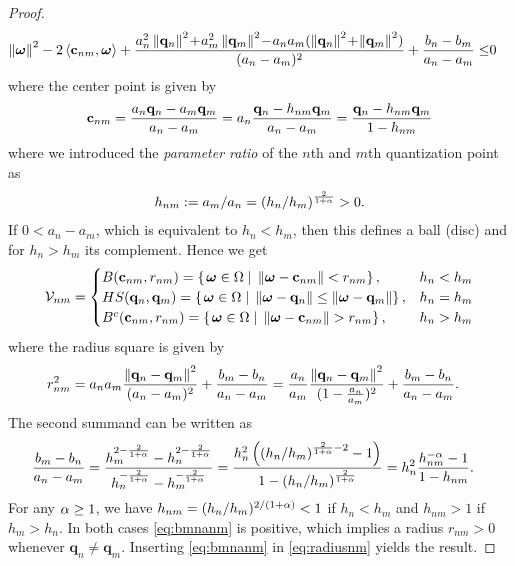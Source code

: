 \documentclass[smallabstract,smallcaptions]{dccpaper}
\renewcommand{\vp}{\mathbf q}
\newcommand{\Vor}{\ensuremath{\mathcal{V}}}         %
\begin{document}
\begin{proof}
\begin{align*}
      \Norm{\vome}^2 -2 \skprod{\vc_{nm}}{\vome} + 
         \frac{a_n^2 \Norm{\vp_n}^2 \!+\!a_m^2 \Norm{\vp_m}^2 \!-\! a_na_m(\Norm{\vp_n}^2 \!+\!\Norm{\vp_m}^2)}{(a_n-a_m)^2} 
         + \frac{b_n-b_m}{a_n-a_m} \leq & 0
  \end{align*}
  where the center point is given by
  \begin{align}
    \vc_{nm}=\frac{a_n\vp_n- a_m\vp_m}{a_n-a_m}=a_n \frac{\vp_n-h_{nm} \vp_m}{a_n -a_m}=\frac{\vp_n -h_{nm}\vp_m}{1-h_{nm}} 
  \end{align}
  where we introduced the \emph{parameter ratio} of the $n$th and $m$th quantization point as
  \begin{align}
    h_{nm}:= a_m/a_n=\left(h_n/h_m\right)^{\frac{2}{1+\alpha}}>0.
  \end{align}
  If $0<a_n-a_m$, which is equivalent to $h_n<h_m$, then this defines a ball (disc) and for $h_n>h_m$ its complement. Hence we get
  \begin{align}
    \Vor_{nm}=\begin{cases}
      B(\vc_{nm},r_{nm})=\set{\vome\in\Omega}{\Norm{\vome-\vc_{nm}}    <  r_{nm}},&  h_n<h_m\\
      HS(\vp_n,\vp_m) = \set{\vome\in\Omega}{ \Norm{\vome- \vp_n}\leq \Norm{\vome- \vp_m}}, &h_n=h_m\\
      B^c(\vc_{nm},r_{nm})=\set{\vome\in\Omega}{\Norm{\vome-\vc_{nm}}    >  r_{nm}},&  h_n >h_m
    \end{cases}
  \end{align}
  where the radius square is given by
  \begin{align}
    r_{nm}^2 
            &= a_na_m\frac{\Norm{\vp_n-\vp_m}^2}{(a_n-a_m)^2} + \frac{b_m-b_n}{a_n-a_m}=
            \frac{a_n}{a_m}\frac{\Norm{\vp_n-\vp_m}^2}{(1-\frac{a_n}{a_m})^2} +
            \frac{b_m-b_n}{a_n-a_m}\label{eq:radiusnm}.
  \end{align}
  The second summand can be written as
  \begin{align}
    \frac{b_m -b_n}{a_n -a_m} &
    = \frac{h_m^{2-\frac{2}{1+\alpha}} - h_n^{2-\frac{2}{1+\alpha}}}{h_n^{-\frac{2}{1+\alpha}}-h_m^{-\frac{2}{1+\alpha}}}
    = \frac{h_n^{2} \left(\left(h_n/h_m\right)^{\frac{2}{1+\alpha}-2} -1\right)}{1-\left(h_n/h_m\right)^{\frac{2}{1+\alpha}}} 
  = h_n^2 \frac{h_{nm}^{-\alpha} -1}{1-h_{nm}}
  \label{eq:bmnanm}.
  \end{align}
  For any $\alpha\geq 1$, we have $h_{nm}=(h_n/h_m)^{2/(1+\alpha)}< 1$ if $h_n<h_m$ and $h_{nm}>1$ if $h_m>h_n$.  In
  both cases \eqref{eq:bmnanm} is positive, which implies a radius
  $r_{nm}>0$ whenever $\vp_n\not=\vp_m$. Inserting \eqref{eq:bmnanm} in \eqref{eq:radiusnm} yields the result. 
\end{proof}
\end{document}
